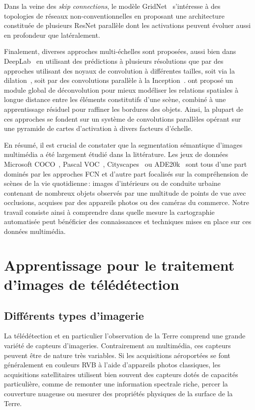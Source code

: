 Dans la veine des \emph{skip connections}, le modèle GridNet~\cite{fourure_residual_2017} s'intéresse à des topologies de réseaux non-conventionnelles en proposant une architecture constituée de plusieurs ResNet parallèle dont les activations peuvent évoluer aussi en profondeur que latéralement.

Finalement, diverses approches multi-échelles sont proposées, aussi bien dans DeepLab~\cite{l._c._chen_deeplab_2018} en utilisant des prédictions à plusieurs résolutions que par des approches utilisant des noyaux de convolution à différentes tailles, soit via la dilation~\cite{yu_multi-scale_2015}, soit par des convolutions parallèle à la Inception~\cite{szegedy_going_2015,nekrasov_global_2016,zhao_pyramid_2017}. \citet{peng_large_2017} ont proposé un module global de déconvolution pour mieux modéliser les relations spatiales à longue distance entre les éléments constitutifs d'une scène, combiné à une apprentissage résiduel pour raffiner les bordures des objets. Ainsi, la plupart de ces approches se fondent sur un système de convolutions parallèles opérant sur une pyramide de cartes d'activation à divers facteurs d'échelle.

En résumé, il est crucial de constater que la segmentation sémantique d'images multimédia a été largement étudié dans la littérature. Les jeux de données Microsoft COCO~\cite{lin_microsoft_2014}, Pascal VOC~\cite{everingham_pascal_2014}, Cityscapes~\cite{cordts_cityscapes_2016} ou ADE20k~\cite{zhou_scene_2017} sont tous d'une part dominés par les approches \gls{FCN} et d'autre part focalisés sur la compréhension de scènes de la vie quotidienne\,: images d'intérieurs ou de conduite urbaine contenant de nombreux objets observés par une multitude de points de vue avec occlusions, acquises par des appareils photos ou des caméras du commerce. Notre travail consiste ainsi à comprendre dans quelle mesure la cartographie automatisée peut bénéficier des connaissances et techniques mises en place sur ces données multimédia.

\section{Apprentissage pour le traitement d'images de télédétection}

\subsection{Différents types d'imagerie}

La télédétection et en particulier l'observation de la Terre comprend une grande variété de capteurs d'imageries. Contrairement au multimédia, ces capteurs peuvent être de nature très variables. Si les acquisitions aéroportées se font généralement en couleurs \gls{RVB} à l'aide d'appareils photos classiques, les acquisitions satellitaires utilisent bien souvent des capteurs dotés de capacités particulière, comme de remonter une information spectrale riche, percer la couverture nuageuse ou mesurer des propriétés physiques de la surface de la Terre.

